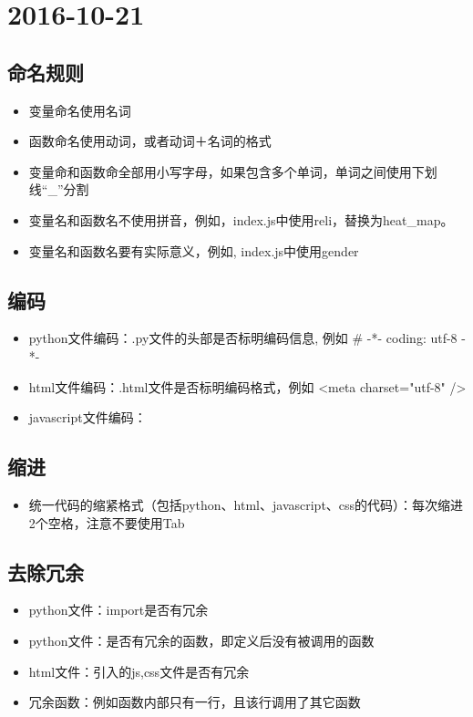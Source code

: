 \section{2016-10-21}

\subsection{命名规则}

\begin{itemize}
  \item 变量命名使用名词
  \item 函数命名使用动词，或者动词＋名词的格式
  \item 变量命和函数命全部用小写字母，如果包含多个单词，单词之间使用下划线“{\_}”分割 
  \item 变量名和函数名不使用拼音，例如，index.js中使用reli，替换为heat{\_}map。
  \item 变量名和函数名要有实际意义，例如, index.js中使用gender
\end{itemize}

\subsection{编码}

\begin{itemize}
  \item python文件编码：.py文件的头部是否标明编码信息, 例如 {\#} -*- coding: utf-8 -*-
  \item html文件编码：.html文件是否标明编码格式，例如 <meta charset="utf-8" />
  \item javascript文件编码：
\end{itemize}

\subsection{缩进}

\begin{itemize}
  \item 统一代码的缩紧格式（包括python、html、javascript、css的代码）：每次缩进2个空格，注意不要使用Tab
\end{itemize}

\subsection{去除冗余}

\begin{itemize}
  \item python文件：import是否有冗余
  \item python文件：是否有冗余的函数，即定义后没有被调用的函数
  \item html文件：引入的js,css文件是否有冗余
  \item 冗余函数：例如函数内部只有一行，且该行调用了其它函数
\end{itemize}

